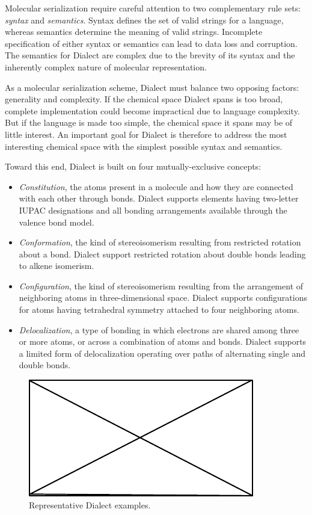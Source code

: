 \documentclass{article}
\begin{document}
Molecular serialization require careful attention to two complementary rule sets: \textit{syntax} and \textit{semantics}. Syntax defines the set of valid strings for a language, whereas semantics determine the meaning of valid strings. Incomplete specification of either syntax or semantics can lead to data loss and corruption. The semantics for Dialect are complex due to the brevity of its syntax and the inherently complex nature of molecular representation.

As a molecular serialization scheme, Dialect must balance two opposing factors: generality and complexity. If the chemical space Dialect spans is too broad, complete implementation could become impractical due to language complexity. But if the language is made too simple, the chemical space it spans may be of little interest. An important goal for Dialect is therefore to address the most interesting chemical space with the simplest possible syntax and semantics.

Toward this end, Dialect is built on four mutually-exclusive concepts:

\begin{itemize}
\item \textit{Constitution}, the atoms present in a molecule and how they are connected with each other through bonds. Dialect supports elements having two-letter IUPAC designations and all bonding arrangements available through the valence bond model.
\item \textit{Conformation}, the kind of stereoisomerism resulting from restricted rotation about a bond. Dialect support restricted rotation about double bonds leading to alkene isomerism.
\item \textit{Configuration}, the kind of stereoisomerism resulting from the arrangement of neighboring atoms in three-dimensional space. Dialect supports configurations for atoms having tetrahedral symmetry attached to four neighboring atoms.
\item \textit{Delocalization}, a type of bonding in which electrons are shared among three or more atoms, or across a combination of atoms and bonds. Dialect supports a limited form of delocalization operating over paths of alternating single and double bonds.
\end{itemize}

\begin{figure}
\centering
\includegraphics{filler}
\caption{Representative Dialect examples.}
\label{fig:myfig}
\end{figure}
\end{document}
